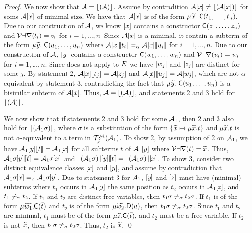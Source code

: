 \begin{proof}
We now show that $\mathcal{A} = \lfloor(\mathcal{A})\rfloor$.
Assume by contradition $\mathcal{A} [x] \neq \lfloor(\mathcal{A} [x])\rfloor$ for some $\mathcal{A} [x]$ of minimal size.
We have that $\mathcal{A} [x]$ is of the form $\MU {\Varec{x}}.\; \const{C}( t_1, \ldots, t_n )$.
Due to our construction of $\mathcal{A}$, 
we know $[x]$ contains a constructor $\textsf{C}( z_1, \ldots, z_n )$ and $\mathcal{Var}( t_i ) = z_i$ for $i = 1, \ldots, n$.
Since $\mathcal{A} [x]$ is a minimal, it
contain a subterm of the form $\MU {\Varec{y}}.\; \const{C}( u_1, \ldots, u_n )$
where $\mathcal{A} [x] \llbracket  t_i  \rrbracket \mathrel{=_\alpha} \mathcal{A} [x] \llbracket  u_i  \rrbracket$ for $i = 1, \ldots, n$.
Due to our construction of $\mathcal{A}$, $[y]$ contains a constructor $\textsf{C}( w_1, \ldots, w_n )$ and $\mathcal{Var}( u_i ) = w_i$ for $i = 1, \ldots, n$.
Since  does not apply to $E$
we have $[w_j]$ and $[z_j]$ are distinct for some $j$.
By statement 2, $\mathcal{A} [x] \llbracket  t_j  \rrbracket = \mathcal{A} [z_j]$
and $\mathcal{A} [x] \llbracket  u_j  \rrbracket = \mathcal{A} [w_j]$,
which are not $\alpha$-equivalent by statement 3, contradicting the fact that $\MU {\Varec{y}}.\; \const{C}( u_1, \ldots, u_n )$ is a bisimilar subterm of $\mathcal{A} [x]$.
Thus, $\mathcal{A} = \lfloor(\mathcal{A})\rfloor$, and statements 2 and 3 hold for $\lfloor(\mathcal{A})\rfloor$.

We now show that if statements 2 and 3 hold for some $\mathcal{A}_1$,
then 2 and 3 also hold for $\lfloor(\mathcal{A}_1 \sigma)\rfloor$,
where $\sigma$ is a substitution of the form $\{ {\widetilde{x}} \mapsto \mu {\widetilde{x}}. t \}$
and $\mu {\widetilde{x}}. t$ is not $\alpha$-equivalent to a term in $\mathcal{T}^{\mathcal{M}}_{\widetilde{x}}(\mathcal{A}_1)$.
To show 2,
by assumption of 2 on $\mathcal{A}_1$, we have $\mathcal{A}_1 [y] \llbracket  t  \rrbracket = \mathcal{A}_1 [x]$ for
all subterms $t$ of $\mathcal{A}_1 [y]$ where $\mathcal{Var}(t) = {\widetilde{x}}$.
Thus, $\mathcal{A}_1 \sigma [y] \llbracket  t  \rrbracket = \mathcal{A}_1 \sigma [x]$ and
$\lfloor(\mathcal{A}_1 \sigma)\rfloor [y] \llbracket  t  \rrbracket = \lfloor(\mathcal{A}_1 \sigma)\rfloor [x]$.
To show 3, 
consider two distinct equivalence classes $[x]$ and $[y]$,
and assume by contradiction that $\mathcal{A}_1 \sigma [x] \mathrel{=_\alpha} \mathcal{A}_1 \sigma [y]$.
Due to statement 3 for $\mathcal{A}_1$,
$[y]$ and $[z]$ must have (minimal) subterms 
where $t_1$ occurs in $\mathcal{A}_1 [y]$ the same position as $t_2$ occurs in $\mathcal{A}_1 [z]$,
and $t_1 \not\mathrel{=_\alpha} t_2$.
If $t_1$ and $t_2$ are distinct free variables,
then $t_1 \sigma \not \mathrel{=_\alpha} t_2 \sigma$.
If $t_1$ is of the form $\mu {\widetilde{w_1}}. \textsf{C}( \bar t )$ 
and $t_2$ is of the form $\mu {\widetilde{w_2}}. \textsf{D}( \bar u )$,
then $t_1 \sigma \not \mathrel{=_\alpha} t_2 \sigma$.
Since $t_1$ and $t_2$ are minimal,
$t_1$ must be of the form $\mu {\widetilde{z}}. \textsf{C}( \bar t )$,
and $t_2$ must be a free variable.
If $t_2$ is not ${\widetilde{x}}$,
then $t_1 \sigma \not \mathrel{=_\alpha} t_2 \sigma$.
Thus, $t_2$ is ${\widetilde{x}}$.
\qed
\end{proof}

